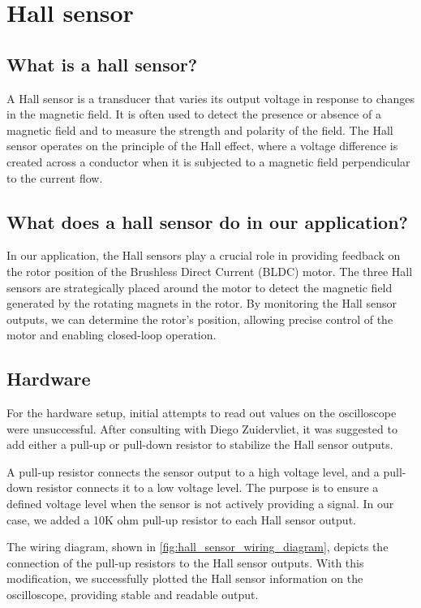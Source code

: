 \section{Hall sensor}
\subsection{What is a hall sensor?}
A Hall sensor is a transducer that varies its output voltage in response to changes in the magnetic field. It is often used to detect the presence or absence of a magnetic field and to measure the strength and polarity of the field. The Hall sensor operates on the principle of the Hall effect, where a voltage difference is created across a conductor when it is subjected to a magnetic field perpendicular to the current flow.\cite{9568879}

\subsection{What does a hall sensor do in our application?}
In our application, the Hall sensors play a crucial role in providing feedback on the rotor position of the Brushless Direct Current (BLDC) motor. The three Hall sensors are strategically placed around the motor to detect the magnetic field generated by the rotating magnets in the rotor. By monitoring the Hall sensor outputs, we can determine the rotor's position, allowing precise control of the motor and enabling closed-loop operation.\cite{7489411}

\subsection{Hardware}
For the hardware setup, initial attempts to read out values on the oscilloscope were unsuccessful. After consulting with Diego Zuidervliet\cite{zuidervliet2024}, it was suggested to add either a pull-up or pull-down resistor to stabilize the Hall sensor outputs.

A pull-up resistor connects the sensor output to a high voltage level, and a pull-down resistor connects it to a low voltage level. The purpose is to ensure a defined voltage level when the sensor is not actively providing a signal. In our case, we added a 10K ohm pull-up resistor to each Hall sensor output.

The wiring diagram, shown in \autoref{fig:hall_sensor_wiring_diagram}, depicts the connection of the pull-up resistors to the Hall sensor outputs. With this modification, we successfully plotted the Hall sensor information on the oscilloscope, providing stable and readable output.

